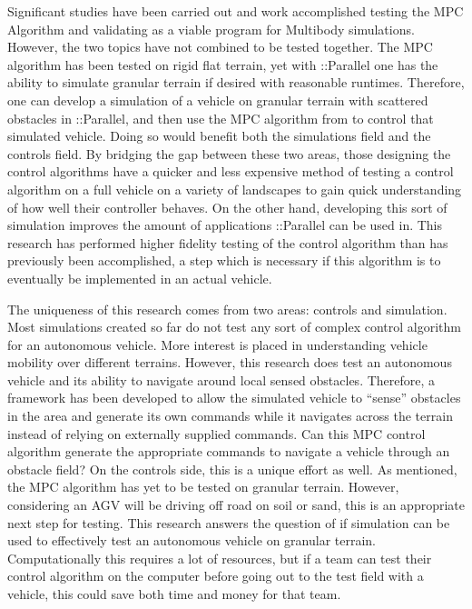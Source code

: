 \documentclass[12pt,onecolumn]{report}
\newcommand{\CHRONO}{{\sffamily{{Chrono}}}}
\newcommand{\ChronoParallel}{{\sffamily{Chrono}}::Parallel}
\begin{document}
Significant studies have been carried out and work accomplished testing the MPC Algorithm and validating {\CHRONO} as a viable program for Multibody simulations. However, the two topics have not combined to be tested together. The MPC algorithm has been tested on rigid flat terrain, yet with {\ChronoParallel} one has the ability to simulate granular terrain if desired with reasonable runtimes. Therefore, one can develop a simulation of a vehicle on granular terrain with scattered obstacles in {\ChronoParallel}, and then use the MPC algorithm from \cite{ModelFidelity2016} to control that simulated vehicle. Doing so would benefit both the simulations field and the controls field. By bridging the gap between these two areas, those designing the control algorithms have a quicker and less expensive method of testing a control algorithm on a full vehicle on a variety of landscapes to gain quick understanding of how well their controller behaves. On the other hand, developing this sort of simulation improves the amount of applications {\ChronoParallel} can be used in. This research has performed higher fidelity testing of the control algorithm than has previously been accomplished, a step which is necessary if this algorithm is to eventually be implemented in an actual vehicle. 

The uniqueness of this research comes from two areas: controls and simulation. Most {\CHRONO} simulations created so far do not test any sort of complex control algorithm for an autonomous vehicle. More interest is placed in understanding vehicle mobility over different terrains. However, this research does test an autonomous vehicle and its ability to navigate around local sensed obstacles. Therefore, a framework has been developed to allow the simulated vehicle to “sense” obstacles in the area and generate its own commands while it navigates across the terrain instead of relying on externally supplied commands. Can this MPC control algorithm generate the appropriate commands to navigate a vehicle through an obstacle field? On the controls side, this is a unique effort as well. As mentioned, the MPC algorithm has yet to be tested on granular terrain. However, considering an AGV will be driving off road on soil or sand, this is an appropriate next step for testing. This research answers the question of if simulation can be used to effectively test an autonomous vehicle on granular terrain. Computationally this requires a lot of resources, but if a team can test their control algorithm on the computer before going out to the test field with a vehicle, this could save both time and money for that team.
\end{document}
